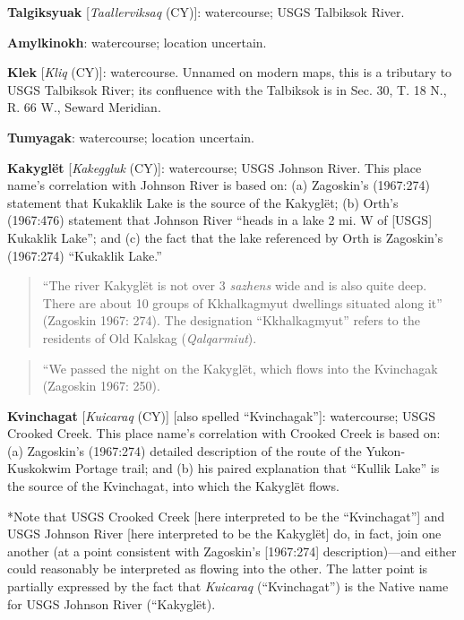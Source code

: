 \begin{hang}

\textbf{Talgiksyuak} [\textit{Taallerviksaq} (CY)]: watercourse; USGS Talbiksok River.



\textbf{Amylkinokh}: watercourse; location uncertain.



\textbf{Klek} [\textit{Kliq} (CY)]: watercourse. Unnamed on modern maps, this is a tributary to USGS Talbiksok River; its confluence with the Talbiksok is in Sec. 30, T. 18 N., R. 66 W., Seward Meridian.



\textbf{Tumyagak}: watercourse; location uncertain.



\textbf{Kakyglët} [\textit{Kakeggluk} (CY)]: watercourse; USGS Johnson River. This place name’s correlation with Johnson River is based on: (a) Zagoskin’s (1967:274) statement that Kukaklik Lake is the source of the Kakyglët; (b) Orth’s (1967:476) statement that Johnson River “heads in a lake 2 mi. W of [USGS] Kukaklik Lake”; and (c) the fact that the lake referenced by Orth is Zagoskin’s (1967:274) “Kukaklik Lake.”



\begin{quote}
    “The river Kakyglët is not over 3 \textit{sazhens} wide and is also quite deep. There are about 10 groups of Kkhalkagmyut dwellings situated along it” (Zagoskin 1967: 274). The designation “Kkhalkagmyut” refers to the residents of Old Kalskag (\textit{Qalqarmiut}).
\end{quote}


\begin{quote}
“We passed the night on the Kakyglët, which flows into the Kvinchagak (Zagoskin 1967: 250).
\end{quote}


\textbf{Kvinchagat} [\textit{Kuicaraq} (CY)] [also spelled “Kvinchagak”]: watercourse; USGS Crooked Creek. This place name’s correlation with Crooked Creek is based on: (a) Zagoskin’s (1967:274) detailed description of the route of the Yukon-Kuskokwim Portage trail; and (b) his paired explanation that “Kullik Lake” is the source of the Kvinchagat, into which the Kakyglët flows.



*Note that USGS Crooked Creek [here interpreted to be the “Kvinchagat”] and USGS Johnson River [here interpreted to be the Kakyglët] do, in fact, join one another (at a point consistent with Zagoskin’s [1967:274] description)—and either could reasonably be interpreted as flowing into the other. The latter point is partially expressed by the fact that \textit{Kuicaraq} (“Kvinchagat”) is the Native name for USGS Johnson River (“Kakyglët).




\end{hang}
